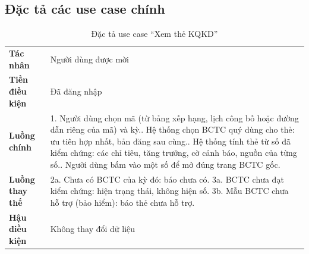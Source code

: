 \documentclass[12pt,a4paper]{report}
\newcommand{\enquote}[1]{“#1”}
\begin{document}
\subsection{Đặc tả các use case chính}
\begin{table}[H]
\centering\small
\caption{Đặc tả use case \enquote{Xem thẻ KQKD}}\label{tab:uc-the}
\begin{tabularx}{\linewidth}{@{}>{\bfseries}p{3.2cm}X@{}}
\toprule
Tác nhân & Người dùng được mời \\
Tiền điều kiện & Đã đăng nhập \\
Luồng chính & 1. Người dùng chọn mã (từ bảng xếp hạng, lịch công bố hoặc đường dẫn riêng của mã) và kỳ.\newline
2. Hệ thống chọn BCTC quý dùng cho thẻ: ưu tiên hợp nhất, bản đăng sau cùng.\newline
3. Hệ thống tính thẻ từ số đã kiểm chứng: các chỉ tiêu, tăng trưởng, cờ cảnh báo, nguồn của từng số.\newline
4. Người dùng bấm vào một số để mở đúng trang BCTC gốc. \\
Luồng thay thế & 2a. Chưa có BCTC của kỳ đó: báo chưa có.\newline
3a. BCTC chưa đạt kiểm chứng: hiện trạng thái, không hiện số.\newline
3b. Mẫu BCTC chưa hỗ trợ (bảo hiểm): báo thẻ chưa hỗ trợ. \\
Hậu điều kiện & Không thay đổi dữ liệu \\
\bottomrule
\end{tabularx}
\end{table}
\end{document}
